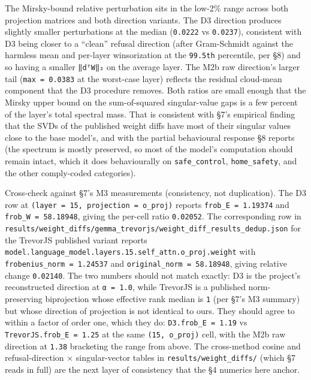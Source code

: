 \documentclass[
  11pt,
]{article}
\begin{document}
The Mirsky-bound relative perturbation sits in the low-2\% range across
both projection matrices and both direction variants. The D3 direction
produces slightly smaller perturbations at the median (\texttt{0.0222}
vs \texttt{0.0237}), consistent with D3 being closer to a ``clean''
refusal direction (after Gram-Schmidt against the harmless mean and
per-layer winsorization at the \texttt{99.5th} percentile, per §8) and
so having a smaller \texttt{‖dᵀW‖₂} on the average layer. The M2b raw
direction's larger tail (\texttt{max\ =\ 0.0383} at the worst-case
layer) reflects the residual cloud-mean component that the D3 procedure
removes. Both ratios are small enough that the Mirsky upper bound on the
sum-of-squared singular-value gaps is a few percent of the layer's total
spectral mass. That is consistent with §7's empirical finding that the
SVDs of the published weight diffs have most of their singular values
close to the base model's, and with the partial behavioural response §8
reports (the spectrum is mostly preserved, so most of the model's
computation should remain intact, which it does behaviourally on
\texttt{safe\_control}, \texttt{home\_safety}, and the other
comply-coded categories).

Cross-check against §7's M3 measurements (consistency, not duplication).
The D3 row at \texttt{(layer\ =\ 15,\ projection\ =\ o\_proj)} reports
\texttt{frob\_E\ =\ 1.19374} and \texttt{frob\_W\ =\ 58.18948}, giving
the per-cell ratio \texttt{0.02052}. The corresponding row in
\texttt{results/weight\_diffs/gemma\_trevorjs/weight\_diff\_results\_dedup.json}
for the TrevorJS published variant reports
\texttt{model.language\_model.layers.15.self\_attn.o\_proj.weight} with
\texttt{frobenius\_norm\ =\ 1.24537} and
\texttt{original\_norm\ =\ 58.18948}, giving relative change
\texttt{0.02140}. The two numbers should not match exactly: D3 is the
project's reconstructed direction at \texttt{α\ =\ 1.0}, while TrevorJS
is a published norm-preserving biprojection whose effective rank median
is \texttt{1} (per §7's M3 summary) but whose direction of projection is
not identical to ours. They should agree to within a factor of order
one, which they do: \texttt{D3.frob\_E\ =\ 1.19} vs
\texttt{TrevorJS.frob\_E\ =\ 1.25} at the same \texttt{(15,\ o\_proj)}
cell, with the M2b raw direction at \texttt{1.38} bracketing the range
from above. The cross-method cosine and refusal-direction ×
singular-vector tables in \texttt{results/weight\_diffs/} (which §7
reads in full) are the next layer of consistency that the §4 numerics
here anchor.
\end{document}
